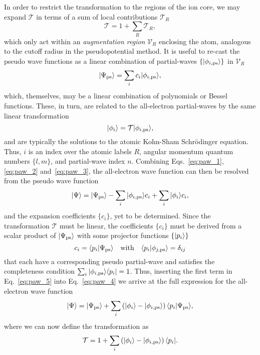 In order to restrict the transformation 
to the regions of the ion core, 
we may expand $\mathcal{T}$ in 
terms of a sum of local contributions $\mathcal{T}_R$ 
%
\begin{equation}
\mathcal{T}=1+\sum_R \mathcal{T}_R, 
\end{equation}
%
which only act within an {\it augmentation region} 
$\mathcal{V}_R$ enclosing the atom, 
analogous to the cutoff radius 
in the pseudopotential method.
%
It is useful to re-cast the pseudo wave functions 
as a linear combination of 
partial-waves $\{\vert\phi_{i,\textrm{ps}}\rangle\}$ 
in $\mathcal{V}_R$ %
%
\begin{equation}
\vert\Psi_\textrm{ps}\rangle=\sum_i c_i\vert\phi_{i,\textrm{ps}}\rangle, 
\label{eq:paw_2}
\end{equation}
%
which, themselves, may be a linear combination of 
polynomials or Bessel functions.
%
These, in turn, are related to the 
all-electron partial-waves by %
the same linear transformation 
%
\begin{equation}
\vert\phi_i\rangle=\mathcal{T}\vert\phi_{i,\textrm{ps}}\rangle, 
\label{eq:paw_3}
\end{equation}
%
and are typically the solutions 
to the atomic Kohn-Sham Schr{\" o}dinger equation.
%
Thus, $i$ is an index over the 
atomic labels $R$, 
angular momentum quantum numbers $\{l,m\}$, 
and partial-wave index $n$.
%
Combining Eqs.~\eqref{eq:paw_1}, \eqref{eq:paw_2} and~\eqref{eq:paw_3}, 
the all-electron wave function can then 
be resolved from the pseudo wave function
%
\begin{equation}
\vert\Psi\rangle=\vert\Psi_\textrm{ps}\rangle - \sum_i \vert\phi_{i,\textrm{ps}}\rangle c_i + \sum_i \vert\phi_i\rangle c_i, 
\label{eq:paw_4}
\end{equation}
%
and the expansion coefficients $\{c_i\}$, 
yet to be determined.
%
Since the transformation $\mathcal{T}$ must be linear, 
the coefficients $\{c_i\}$ 
must be derived from a scalar product 
of $\vert\Psi_\textrm{ps}\rangle$ 
with some projector functions $\{\vert p_i\rangle\}$
%
\begin{equation}
c_i=\langle p_i\vert\Psi_\textrm{ps}\rangle 
\quad\mbox{with}\quad
\langle p_i\vert\phi_{j,\textrm{ps}}\rangle=\delta_{ij}
\label{eq:paw_5}
\end{equation}
%
that each have a corresponding pseudo partial-wave 
and satisfies the completeness condition 
$\sum_i\vert\phi_{i,\textrm{ps}}\rangle\langle p_i\vert=1$.
%
Thus, inserting the first term in Eq.~\eqref{eq:paw_5} 
into Eq.~\eqref{eq:paw_4} 
we arrive at the full expression for the all-electron wave function 
\begin{equation}
\vert\Psi\rangle=\vert\Psi_\textrm{ps}\rangle + \sum_i\left(\vert\phi_i\rangle-\vert\phi_{i,\textrm{ps}}\rangle\right)\langle p_i\vert\Psi_\textrm{ps}\rangle,  
\end{equation}
%
where we can now define the transformation as 
%
\begin{equation}
\mathcal{T}=1+\sum_i\left(\vert\phi_i\rangle-\vert\phi_{i,\textrm{ps}}\rangle\right)\langle p_i\vert.
\label{eq:paw_6}
\end{equation}

